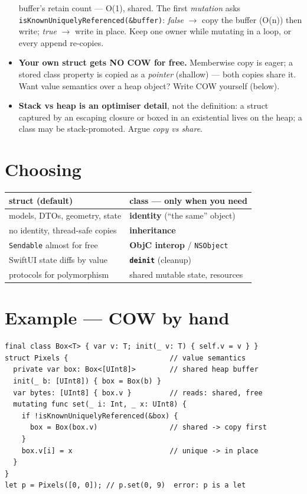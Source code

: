 \documentclass[8pt]{extarticle}
\begin{document}
\begin{multicols}{2}
\begin{itemize}
        buffer's retain count — O(1), shared. The first \emph{mutation} asks
        \texttt{isKnownUniquelyReferenced(\&buffer)}: \emph{false} $\to$ copy the
        buffer (O(n)) then write; \emph{true} $\to$ write in place. Keep one
        owner while mutating in a loop, or every append re-copies.
  \item \textbf{Your own struct gets NO COW for free.} Memberwise copy is eager;
        a stored class property is copied as a \emph{pointer} (shallow) — both
        copies share it. Want value semantics over a heap object? Write COW
        yourself (below).
  \item \textbf{Stack vs heap is an optimiser detail}, not the definition: a
        struct captured by an escaping closure or boxed in an existential lives
        on the heap; a class may be stack-promoted. Argue \emph{copy vs share}.
\end{itemize}

\section{Choosing}
{\footnotesize
\setlength{\tabcolsep}{3pt}
\begin{tabular}{@{}p{36mm}p{38mm}@{}}
\toprule
\textbf{struct (default)} & \textbf{class — only when you need} \\
\midrule
models, DTOs, geometry, state & \textbf{identity} (``the same'' object) \\
no identity, thread-safe copies & \textbf{inheritance} \\
\texttt{Sendable} almost for free & \textbf{ObjC interop} / \texttt{NSObject} \\
SwiftUI state diffs by value & \textbf{\texttt{deinit}} (cleanup) \\
protocols for polymorphism & shared mutable state, resources \\
\bottomrule
\end{tabular}}

\section{Example — COW by hand}
\begin{lstlisting}[language=SwiftSheet]
final class Box<T> { var v: T; init(_ v: T) { self.v = v } }
struct Pixels {                        // value semantics
  private var box: Box<[UInt8]>        // shared heap buffer
  init(_ b: [UInt8]) { box = Box(b) }
  var bytes: [UInt8] { box.v }         // reads: shared, free
  mutating func set(_ i: Int, _ x: UInt8) {
    if !isKnownUniquelyReferenced(&box) {
      box = Box(box.v)                 // shared -> copy first
    }
    box.v[i] = x                       // unique -> in place
  }
}
let p = Pixels([0, 0]); // p.set(0, 9)  error: p is a let
\end{lstlisting}


\end{multicols}
\end{document}
